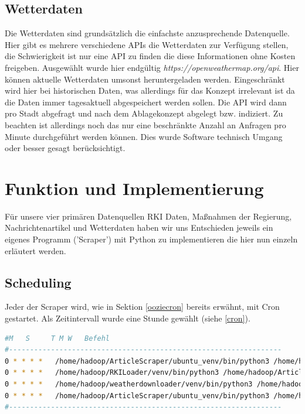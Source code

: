 \documentclass[12pt,oneside,a4paper,parskip]{scrbook}
\begin{document}
\section{Wetterdaten}
Die Wetterdaten sind grunds\"atzlich die einfachste anzusprechende Datenquelle. Hier gibt es mehrere verschiedene APIs die Wetterdaten zur Verfügung stellen, die Schwierigkeit ist nur eine API zu finden die diese Informationen ohne Kosten freigeben.
Ausgew\"ahlt wurde hier endg\"ultig \textit{https://openweathermap.org/api}. Hier k\"onnen aktuelle Wetterdaten umsonst heruntergeladen werden. Eingeschr\"ankt wird hier bei historischen Daten, was allerdings f\"ur das Konzept irrelevant ist da die Daten immer tagesaktuell abgespeichert werden sollen. \newline
Die API wird dann pro Stadt abgefragt und nach dem Ablagekonzept abgelegt bzw. indiziert. Zu beachten ist allerdings noch das nur eine beschr\"ankte Anzahl an Anfragen pro Minute durchgef\"uhrt werden k\"onnen. Dies wurde Software technisch Umgang oder besser gesagt ber\"ucksichtigt.


\chapter{Funktion und Implementierung}

Für unsere vier primären Datenquellen RKI Daten, Maßnahmen der Regierung, Nachrichtenartikel und Wetterdaten haben wir uns Entschieden jeweils ein eigenes Programm ('Scraper') mit Python zu implementieren die hier nun einzeln erläutert werden. \newline

\section{Scheduling}
Jeder der Scraper wird, wie in Sektion \ref{ooziecron} bereits erwähnt, mit Cron gestartet. Als Zeitintervall wurde eine Stunde gewählt (siehe \ref{cron}). \newline

\begin{lstlisting}[caption=Cron-einstellungen,label=cron,language=bash]
#M   S     T M W   Befehl
#-----------------------------------------------------------------
0 * * * *   /home/hadoop/ArticleScraper/ubuntu_venv/bin/python3 /home/hadoop/ArticleScraper/main.py
0 * * * *   /home/hadoop/RKILoader/venv/bin/python3 /home/hadoop/ArticleScraper/main.py
0 * * * *   /home/hadoop/weatherdownloader/venv/bin/python3 /home/hadoop/ArticleScraper/main.py
0 * * * *   /home/hadoop/ArticleScraper/ubuntu_venv/bin/python3 /home/hadoop/ArticleScraper/main.py
#-----------------------------------------------------------------
\end{lstlisting}
\end{document}
